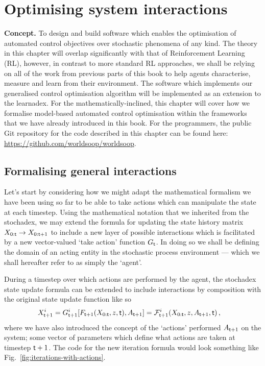 \chapter{\sffamily Optimising system interactions}

{\bfseries\sffamily Concept.} To design and build software which enables the optimisation of automated control objectives over stochastic phenomena of any kind. The theory in this chapter will overlap significantly with that of Reinforcement Learning (RL), however, in contrast to more standard RL approaches, we shall be relying on all of the work from previous parts of this book to help agents characterise, measure and learn from their environment. The software which implements our generalised control optimisation algorithm will be implemented as an extension to the learnadex. For the mathematically-inclined, this chapter will cover how we formalise model-based automated control optimisation within the frameworks that we have already introduced in this book. For the programmers, the public Git repository for the code described in this chapter can be found here: \href{https://github.com/worldsoop/worldsoop}{https://github.com/worldsoop/worldsoop}.

\section{\sffamily Formalising general interactions}

Let's start by considering how we might adapt the mathematical formalism we have been using so far to be able to take actions which can manipulate the state at each timestep. Using the mathematical notation that we inherited from the stochadex, we may extend the formula for updating the state history matrix $X_{0:{\sf t}}\rightarrow X_{0:{\sf t}+1}$ to include a new layer of possible interactions which is facilitated by a new vector-valued `take action' function $G_{{\sf t}}$. In doing so we shall be defining the domain of an acting entity in the stochastic process environment --- which we shall hereafter refer to as simply the `agent'.

During a timestep over which actions are performed by the agent, the stochadex state update formula can be extended to include interactions by composition with the original state update function like so
\begin{align}
X_{{\sf t}+1}^i &= G^i_{{\sf t}+1}[F_{{\sf t}+1}(X_{0:{\sf t}}, z, {\sf t}), A_{{\sf t}+1}] = {\cal F}^i_{{\sf t}+1}(X_{0:{\sf t}}, z, A_{{\sf t}+1}, {\sf t}) \label{eq:generalised-state-actions} \,,
\end{align}
where we have also introduced the concept of the `actions' performed $A_{{\sf t}+1}$ on the system; some vector of parameters which define what actions are taken at timestep ${\sf t}+1$. The code for the new iteration formula would look something like Fig.~\ref{fig:iterations-with-actions}.

